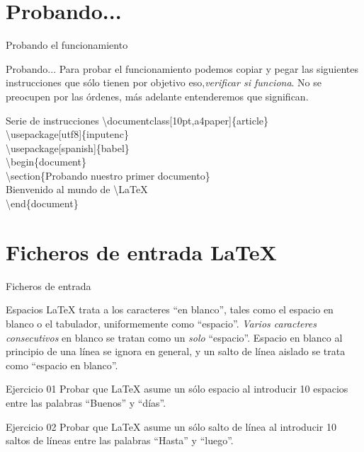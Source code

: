 \documentclass[10pt]{beamer}
\begin{document}
\section{Probando...}
\begin{frame}{Probando el funcionamiento}
	\begin{alertblock}{Probando...}
		Para probar el funcionamiento podemos copiar y pegar las siguientes instrucciones que sólo tienen por objetivo eso,\textit{verificar si funciona}. No se preocupen por las órdenes, más adelante entenderemos que significan.
	\end{alertblock}

	\begin{block}{Serie de instrucciones}
		\textbackslash documentclass[10pt,a4paper]\{article\} \\
		\textbackslash usepackage[utf8]\{inputenc\} \\
		\textbackslash usepackage[spanish]\{babel\} \\
		\textbackslash begin\{document\} \\
		\textbackslash section\{Probando nuestro primer documento\} \\
		Bienvenido al mundo de \textbackslash LaTeX \\
		\textbackslash end\{document\}
	\end{block}
\end{frame}

\section{Ficheros de entrada \LaTeX{}}

\begin{frame}{Ficheros de entrada}
	\begin{block}{Espacios}
		\LaTeX{} trata a los caracteres “en blanco”, tales como el espacio en blanco o el tabulador, uniformemente como “espacio”. \emph{Varios caracteres consecutivos} en blanco se tratan como un \emph{solo} “espacio”. Espacio en blanco al principio de una línea se ignora en general, y un salto de línea aislado se trata como “espacio en blanco”.
	\end{block}
	\begin{exampleblock}{Ejercicio 01}
		Probar que \LaTeX{} asume un sólo espacio al introducir 10 espacios entre las palabras “Buenos” y “días”.	
	\end{exampleblock}
	\begin{exampleblock}{Ejercicio 02}
		Probar que \LaTeX{} asume un sólo salto de línea al introducir 10 saltos de líneas entre las palabras “Hasta” y “luego”.	
	\end{exampleblock}
\end{frame}
\end{document}
